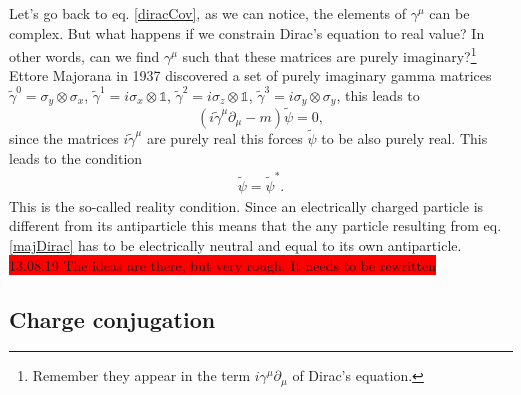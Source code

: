 Let's go back to eq. \ref{diracCov}, as we can notice, the elements of $\gamma^\mu$ can be complex. But what happens if we constrain Dirac's equation to real value? In other words, can we find $\gamma^\mu$ such that these matrices are purely imaginary?\footnote{Remember they appear in the term $i\gamma^\mu\partial_\mu$ of Dirac's equation.} Ettore Majorana in 1937 \cite{Majorana37} discovered a set of purely imaginary gamma matrices $\tilde{\gamma}^0 = \sigma_y \otimes \sigma_x$, $\tilde{\gamma}^1 = i\sigma_x\otimes \mathbb{1}$, $\tilde{\gamma}^2 = i\sigma_z\otimes \mathbb{1}$, $\tilde{\gamma}^3 = i\sigma_y\otimes \sigma_y$, this leads to
\begin{equation}
    (i\tilde{\gamma}^\mu\partial_\mu - m)\tilde{\psi} = 0,\label{majDirac}
\end{equation}
since the matrices $i\tilde{\gamma}^\mu$ are purely real this forces $\tilde{\psi}$ to be also purely real. This leads to the condition
\begin{eqnarray}
  \tilde{\psi} = \tilde{\psi}^*.
\end{eqnarray}
This is the so-called reality condition. Since an electrically charged particle is different from its antiparticle this means that the any particle resulting from eq. \ref{majDirac} has to be electrically neutral and equal to its own antiparticle.\\

\colorbox{red}{13.08.19 The ideas are there, but very rough. It needs to be rewritten}

\subsection{Charge conjugation}

